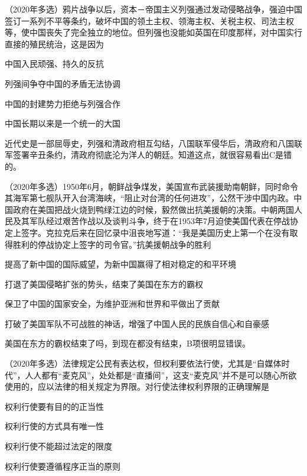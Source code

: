\documentclass[lang=cn,newtx,10pt,scheme=chinese,pad,twocol]{zznote}
\begin{document}
\begin{example} （2020年多选）鸦片战争以后，资本－帝国主义列强通过发动侵略战争，强迫中国签订一系列不平等条约，破坏中国的领土主权、领海主权、关税主权、司法主权等，使中国丧失了完全独立的地位。但列强也没能如英国在印度那样，对中国实行直接的殖民统治，这是因为
	\begin{choice}
		\item 中国入民顽强、持久的反抗
		\item 列强间争夺中国的矛盾无法协调
		\item 中国的封建势力拒绝与列强合作
		\item 中国长期以来是一个统一的大国
	\end{choice}
\end{example}
\begin{solution}
	近代史是一部屈辱史，列强和清政府相互勾结，八国联军侵华后，清政府和八国联军签署辛丑条约，清政府彻底沦为洋人的朝廷。知道这点，就很容易看出C是错的。
\end{solution}
\begin{example} （2020年多选）1950年6月，朝鲜战争煤发，美国宣布武装援助南朝鲜，同时命令其海军第七舰队开入台湾海峡，“阻止对台湾的任何进攻”，公然干涉中国内政。中国政府在美国把战火烧到鸭绿江边的时候，毅然做出抗美援朝的决策。中朝两国人民及其军队经过艰苦作战以及谈判斗争，终于在1953年7月迫使美国代表在停战协定上签字。克拉克后来在回忆录中沮丧地写道：“我是美国历史上第一个在没有取得胜利的停战协定上签字的司令官。”抗美援朝战争的胜利
	\begin{choice}
		\item 提高了新中国的国际威望，为新中国赢得了相对稳定的和平环境
		\item 打退了美国侵略扩张的势头，结束了美国在东方的霸权
		\item 保卫了中国的国家安全，为维护亚洲和世界和平做出了贡献
		\item 打破了美国军队不可战胜的神话，增强了中国人民的民族自信心和自豪感
	\end{choice}
\end{example}
\begin{solution}
	美国在东方的霸权结束了吗，到现在都没有结束，B项很明显错误。
\end{solution}
\begin{example} （2020年多选）法律规定公民有表达权，但权利要依法行使，尤其是“自媒体时代”，人人都有“麦克风”，处处都是“直播间”，这支“麦克风”并不是可以随心所欲使用的，应以法律的相关规定为界限。对行使法律权利界限的正确理解是
	\begin{choice}
		\item 权利行使要有目的的正当性
		\item 权利行使的方式具有唯一性
		\item 权利行使不能超过法定的限度
		\item 权利行使要遵循程序正当的原则
	\end{choice}
\end{example}
\end{document}
